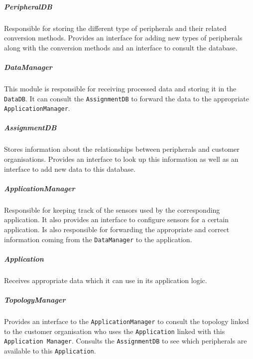 \documentclass[english]{sareport}
\begin{document}
\subparagraph{PeripheralDB}
Responsible for storing the different type of peripherals and their related conversion methods. Provides an interface for adding new types of peripherals along with the conversion methods and an interface to consult the database.

\subparagraph{DataManager}
This module is responsible for receiving processed data and storing it in the \texttt{DataDB}. It can consult the \texttt{AssignmentDB} to forward the data to the appropriate \texttt{ApplicationManager}.

\subparagraph{AssignmentDB}
Stores information about the relationships between peripherals and customer organisations. Provides an interface to look up this information as well as an interface to add new data to this database.

\subparagraph{ApplicationManager}
Responsible for keeping track of the sensors used by the corresponding application. It also provides an interface to configure sensors for a certain application. Is also responsible for forwarding the appropriate and correct information coming from the \texttt{DataManager} to the application.

\subparagraph{Application}
Receives appropriate data which it can use in its application logic.

\subparagraph{TopologyManager}
Provides an interface to the \texttt{ApplicationManager} to consult the topology linked to the customer organisation who uses the \texttt{Application} linked with this \texttt{Application Manager}. Consults the \texttt{AssignmentDB} to see which peripherals are available to this \texttt{Application}.
\end{document}
